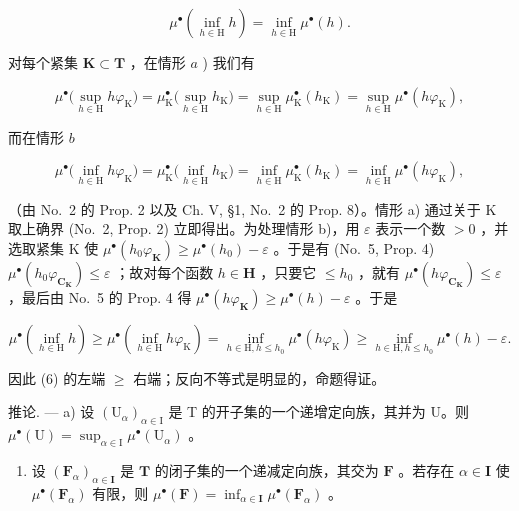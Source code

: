 \[
\mu^ {\bullet} \left(\inf _ {h \in \mathrm{H}} h\right) = \inf _ {h \in \mathrm{H}} \mu^ {\bullet} (h).\tag{6}
\]

对每个紧集 \(\mathbf{K} \subset \mathbf{T}\) ，在情形 \(a\) ) 我们有

\[
\mu^ {\bullet} \Big (\sup _ {h \in \mathrm{H}} h \varphi_ {\mathrm{K}} \Big) = \mu_ {\mathrm{K}} ^ {\bullet} \Big (\sup _ {h \in \mathrm{H}} h _ {\mathrm{K}} \Big) = \sup _ {h \in \mathrm{H}} \mu_ {\mathrm{K}} ^ {\bullet} (h _ {\mathrm{K}}) = \sup _ {h \in \mathrm{H}} \mu^ {\bullet} (h \varphi_ {\mathrm{K}}),
\]

而在情形 \(b\)

\[
\mu^ {\bullet} \Big (\inf _ {h \in \mathrm{H}} h \varphi_ {\mathrm{K}} \Big) = \mu_ {\mathrm{K}} ^ {\bullet} \Big (\inf _ {h \in \mathrm{H}} h _ {\mathrm{K}} \Big) = \inf _ {h \in \mathrm{H}} \mu_ {\mathrm{K}} ^ {\bullet} (h _ {\mathrm{K}}) = \inf _ {h \in \mathrm{H}} \mu^ {\bullet} (h \varphi_ {\mathrm{K}}),
\]

（由 No.~2 的 Prop. 2 以及 Ch. V, §1, No.~2 的 Prop. 8）。情形 a) 通过关于 K 取上确界 (No.~2, Prop. 2) 立即得出。为处理情形 b)，用 \(\varepsilon\) 表示一个数 \(>0\) ，并选取紧集 K 使 \(\mu^{\bullet}(h_0\varphi_{\mathbf{K}}) \geqslant \mu^{\bullet}(h_0) - \varepsilon\) 。于是有 (No.~5, Prop. 4) \(\mu^{\bullet}(h_0\varphi_{\mathbf{C}_{\mathbf{K}}}) \leqslant \varepsilon\) ；故对每个函数 \(h \in \mathbf{H}\) ，只要它 \(\leqslant h_0\) ，就有 \(\mu^{\bullet}(h\varphi_{\mathbf{C}_{\mathbf{K}}}) \leqslant \varepsilon\) ，最后由 No.~5 的 Prop. 4 得 \(\mu^{\bullet}(h\varphi_{\mathbf{K}}) \geqslant \mu^{\bullet}(h) - \varepsilon\) 。于是

\[
\mu^ {\bullet} \left(\inf _ {h \in \mathrm{H}} h\right) \geqslant \mu^ {\bullet} \left(\inf _ {h \in \mathrm{H}} h \varphi_ {\mathrm{K}}\right) = \inf _ {h \in \mathrm{H}, h \leqslant h _ {0}} \mu^ {\bullet} (h \varphi_ {\mathrm{K}}) \geqslant \inf _ {h \in \mathrm{H}, h \leqslant h _ {0}} \mu^ {\bullet} (h) - \varepsilon .
\]

因此 (6) 的左端 \(\geqslant\) 右端；反向不等式是明显的，命题得证。

推论. --- a) 设 \((\mathrm{U}_{\alpha})_{\alpha \in \mathrm{I}}\) 是 T 的开子集的一个递增定向族，其并为 U。则 \(\mu^{\bullet}(\mathrm{U}) = \sup_{\alpha \in \mathrm{I}} \mu^{\bullet}(\mathrm{U}_{\alpha})\) 。

\begin{enumerate}
\def\labelenumi{\alph{enumi})}
\setcounter{enumi}{1}
\tightlist
\item
  设 \((\mathbf{F}_{\alpha})_{\alpha \in \mathbf{I}}\) 是 \(\mathbf{T}\) 的闭子集的一个递减定向族，其交为 \(\mathbf{F}\) 。若存在 \(\alpha \in \mathbf{I}\) 使 \(\mu^{\bullet}(\mathbf{F}_{\alpha})\) 有限，则 \(\mu^{\bullet}(\mathbf{F}) = \inf_{\alpha \in \mathbf{I}} \mu^{\bullet}(\mathbf{F}_{\alpha})\) 。
\end{enumerate}

